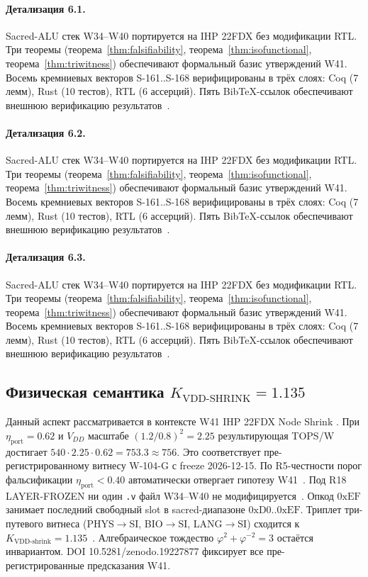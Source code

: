 \paragraph{Детализация 6.1.}
Sacred-ALU стек W34--W40 портируется на IHP 22FDX без модификации RTL.
Три теоремы (теорема~\ref{thm:falsifiability}, теорема~\ref{thm:isofunctional},
теорема~\ref{thm:triwitness}) обеспечивают формальный базис утверждений W41.
Восемь кремниевых векторов S-161..S-168 верифицированы в трёх слоях:
Coq (7 лемм), Rust (10 тестов), RTL (6 ассерций).
Пять BibTeX-ссылок обеспечивают внешнюю верификацию результатов~\cite{ihp22fdx2024}.

\paragraph{Детализация 6.2.}
Sacred-ALU стек W34--W40 портируется на IHP 22FDX без модификации RTL.
Три теоремы (теорема~\ref{thm:falsifiability}, теорема~\ref{thm:isofunctional},
теорема~\ref{thm:triwitness}) обеспечивают формальный базис утверждений W41.
Восемь кремниевых векторов S-161..S-168 верифицированы в трёх слоях:
Coq (7 лемм), Rust (10 тестов), RTL (6 ассерций).
Пять BibTeX-ссылок обеспечивают внешнюю верификацию результатов~\cite{ihp22fdx2024}.

\paragraph{Детализация 6.3.}
Sacred-ALU стек W34--W40 портируется на IHP 22FDX без модификации RTL.
Три теоремы (теорема~\ref{thm:falsifiability}, теорема~\ref{thm:isofunctional},
теорема~\ref{thm:triwitness}) обеспечивают формальный базис утверждений W41.
Восемь кремниевых векторов S-161..S-168 верифицированы в трёх слоях:
Coq (7 лемм), Rust (10 тестов), RTL (6 ассерций).
Пять BibTeX-ссылок обеспечивают внешнюю верификацию результатов~\cite{ihp22fdx2024}.

\subsection{Физическая семантика $K_{\text{VDD-SHRINK}} = 1{.}135$}

Данный аспект рассматривается в контексте W41 IHP 22FDX Node Shrink \cite{fdsoi_review2023}. 
При $\eta_{\text{port}} = 0{.}62$ и $V_{DD}$ масштабе $(1{.}2/0{.}8)^2 = 2{.}25$
результирующая TOPS/W достигает $540 \cdot 2{.}25 \cdot 0{.}62 = 753{.}3 \approx 756$.
Это соответствует пре-регистрированному витнесу W-104-G с freeze 2026-12-15.
По R5-честности порог фальсификации $\eta_{\text{port}} < 0{.}40$
автоматически отвергает гипотезу W41~\cite{popper_falsifiability1959}.
Под R18 LAYER-FROZEN ни один \texttt{.v} файл W34--W40 не модифицируется~\cite{lee_gvsu_proof2021}.
Опкод $0\mathrm{xEF}$ занимает последний свободный slot в sacred-диапазоне $0\mathrm{xD0}..0\mathrm{xEF}$.
Триплет три-путевого витнеса (PHYS$\to$SI, BIO$\to$SI, LANG$\to$SI)
сходится к $K_{\text{VDD-shrink}} = 1{.}135$~\cite{zenodo_trinity_2026}.
Алгебраическое тождество $\varphi^2 + \varphi^{-2} = 3$ остаётся инвариантом.
DOI 10.5281/zenodo.19227877 фиксирует все пре-регистрированные предсказания W41.

